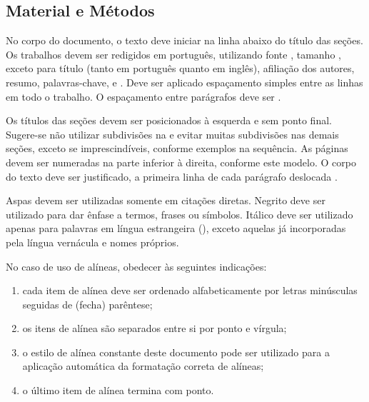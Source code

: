 \documentclass[%
  a4paper,%
  12pt,%
  fleqn,%
  english,%
  brazilian,%
]{article}
\begin{document}
\begin{OverleafFreePlan}
\section{Material e Métodos}%
\label{sect:mat-meth}

No corpo do documento, o texto deve iniciar na linha abaixo do título das seções.
Os trabalhos devem ser redigidos em português, utilizando fonte , tamanho , exceto para título (tanto em português quanto em inglês), afiliação dos autores, resumo, palavras-chave,  e .
Deve ser aplicado espaçamento simples entre as linhas em todo o trabalho.
O espaçamento entre parágrafos deve ser .

Os títulos das seções devem ser posicionados à esquerda e sem ponto final.
Sugere-se não utilizar subdivisões na  e evitar muitas subdivisões nas demais seções, exceto se imprescindíveis, conforme exemplos na sequência.
As páginas devem ser numeradas na parte inferior à direita, conforme este modelo.
O corpo do texto deve ser justificado, a primeira linha de cada parágrafo deslocada .

Aspas devem ser utilizadas somente em citações diretas.
Negrito deve ser utilizado para dar ênfase a termos, frases ou símbolos.
Itálico deve ser utilizado apenas para palavras em língua estrangeira (), exceto aquelas já incorporadas pela língua vernácula e nomes próprios.

No caso de uso de alíneas, obedecer às seguintes indicações:

\begin{enumerate}[label = {\alphsect}]
\item cada item de alínea deve ser ordenado alfabeticamente por letras minúsculas seguidas de (fecha) parêntese;
\item os itens de alínea são separados entre si por ponto e vírgula;
\item o estilo de alínea constante deste documento pode ser utilizado para a aplicação automática da formatação correta de alíneas;
\item o último item de alínea termina com ponto.
\end{enumerate}


\end{OverleafFreePlan}
\end{document}

